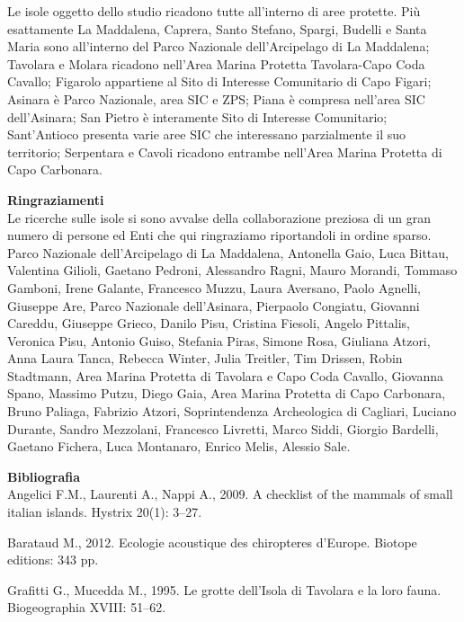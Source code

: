 \begin{multicols}{2}
\begin{compactdesc}
Le isole oggetto dello studio ricadono tutte all’interno di aree protette. Più esattamente La Maddalena, Caprera, Santo Stefano, Spargi, Budelli e Santa Maria sono all’interno del Parco Nazionale dell’Arcipelago di La Maddalena; Tavolara e Molara ricadono nell’Area Marina Protetta Tavolara-Capo Coda Cavallo; Figarolo appartiene al Sito di Interesse Comunitario di Capo Figari; Asinara è Parco Nazionale, area SIC e ZPS; Piana è compresa nell’area SIC dell’Asinara; San Pietro è interamente Sito di Interesse Comunitario; Sant’Antioco presenta varie aree SIC che interessano parzialmente il suo territorio; Serpentara e Cavoli ricadono entrambe nell’Area Marina Protetta di Capo Carbonara.

\vskip3mm

\begin{small}
\noindent\textbf{Ringraziamenti}\\
Le ricerche sulle isole si sono avvalse della collaborazione preziosa di un gran numero di persone ed Enti che qui ringraziamo riportandoli in ordine sparso. Parco Nazionale dell’Arcipelago di La Maddalena, Antonella Gaio, Luca Bittau, Valentina Gilioli, Gaetano Pedroni, Alessandro Ragni, Mauro Morandi, Tommaso Gamboni, Irene Galante, Francesco Muzzu, Laura Aversano, Paolo Agnelli, Giuseppe Are, Parco Nazionale dell’Asinara, Pierpaolo Congiatu, Giovanni Careddu, Giuseppe Grieco, Danilo Pisu, Cristina Fiesoli, Angelo Pittalis, Veronica Pisu, Antonio Guiso, Stefania Piras, Simone Rosa, Giuliana Atzori, Anna Laura Tanca, Rebecca Winter, Julia Treitler, Tim Drissen, Robin Stadtmann, Area Marina Protetta di Tavolara e Capo Coda Cavallo, Giovanna Spano, Massimo Putzu, Diego Gaia, Area Marina Protetta di Capo Carbonara, Bruno Paliaga, Fabrizio Atzori, Soprintendenza Archeologica di Cagliari, Luciano Durante, Sandro Mezzolani, Francesco Livretti, Marco Siddi, Giorgio Bardelli, Gaetano Fichera, Luca Montanaro, Enrico Melis, Alessio Sale. 

\vskip3mm

\noindent\textbf{Bibliografia}\\

Angelici F.M., Laurenti A., Nappi A., 2009. A checklist of the mammals of small italian islands. Hystrix 20(1): 3--27.

Barataud M., 2012. Ecologie acoustique des chiropteres d’Europe. Biotope editions: 343 pp.

Grafitti G., Mucedda M., 1995. Le grotte dell'Isola di Tavolara e la loro fauna. Biogeographia XVIII: 51--62.


\end{small}
\end{compactdesc}
\end{multicols}
